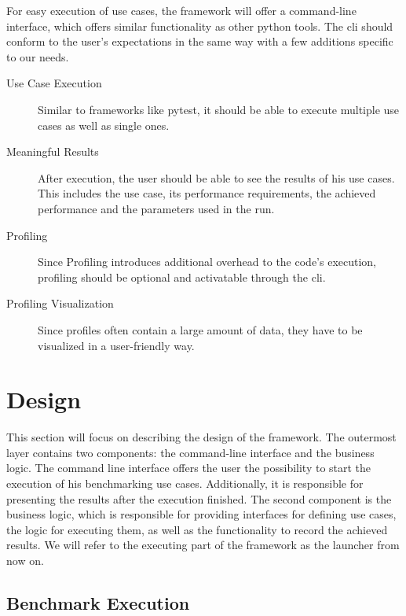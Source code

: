 For easy execution of use cases, the framework will offer a command-line
interface, which offers similar functionality as other python tools. The
\gls{cli} should conform to the user's expectations in the same way with a few
additions specific to our needs. 

\begin{description}
    \item[Use Case Execution]
        Similar to frameworks like pytest, it should be able to execute multiple
        use cases as well as single ones.
    \item[Meaningful Results]
        After execution, the user should be able to see the results of
        his use cases. This includes the use case, its performance requirements,
        the achieved performance and the parameters used in the run.
    \item[Profiling]
        Since Profiling introduces additional overhead to the code's execution,
        profiling should be optional and activatable through the \gls{cli}.
    \item[Profiling Visualization]
        Since profiles often contain a large amount of data, they have to be
        visualized in a user-friendly way.
\end{description}



\section{Design}

\label{sec:application:design}

This section will focus on describing the design of the framework. The outermost
layer contains two components: the command-line interface and the business
logic. The command line interface offers the user the possibility to start the
execution of his benchmarking use cases. Additionally, it is responsible for
presenting the results after the execution finished. The second component is the
business logic, which is responsible for providing interfaces for defining use
cases, the logic for executing them, as well as the functionality to record the
achieved results. We will refer to the executing part of the framework as the
launcher from now on.

\subsection{Benchmark Execution}

